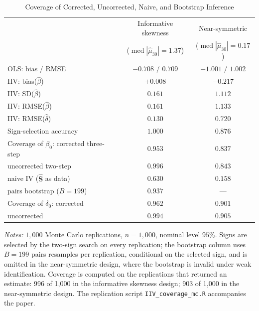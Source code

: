 \begin{table}[!h]
\centering
\caption{Coverage of Corrected, Uncorrected, Naive, and Bootstrap Inference}
\label{tab:coverage}
\begin{threeparttable}
\begin{tabular}{lcc}
\toprule
& Informative skewness & Near-symmetric \\
& (\(\operatorname{med}|\widehat\mu_{30}|=1.37\)) & (\(\operatorname{med}|\widehat\mu_{30}|=0.17\)) \\
\midrule
OLS: bias / RMSE                       & \(-0.708\) / \(0.709\) & \(-1.001\) / \(1.002\) \\
IIV: bias(\(\widehat\beta\))           & \(+0.008\) & \(-0.217\) \\
IIV: SD(\(\widehat\beta\))             & \(0.161\) & \(1.112\) \\
IIV: RMSE(\(\widehat\beta\))           & \(0.161\) & \(1.133\) \\
IIV: RMSE(\(\widehat\delta\))          & \(0.130\) & \(0.720\) \\
Sign-selection accuracy                & \(1.000\) & \(0.876\) \\
\midrule
Coverage of \(\beta_0\): corrected three-step & \(0.953\) & \(0.837\) \\
\quad uncorrected two-step             & \(0.996\) & \(0.843\) \\
\quad naive IV (\(\widehat{\mathbf S}\) as data) & \(0.630\) & \(0.158\) \\
\quad pairs bootstrap (\(B=199\))      & \(0.937\) & --- \\
\midrule
Coverage of \(\delta_0\): corrected    & \(0.962\) & \(0.901\) \\
\quad uncorrected                      & \(0.994\) & \(0.905\) \\
\bottomrule
\end{tabular}
\begin{tablenotes}
\small
\item \textit{Notes:} \(1{,}000\) Monte Carlo replications, \(n=1{,}000\),
nominal level \(95\%\). Signs are selected by the two-sign search on every
replication; the bootstrap column uses \(B=199\) pairs resamples per
replication, conditional on the selected sign, and is omitted in the
near-symmetric design, where the bootstrap is invalid under weak
identification. Coverage is computed on the replications that returned an
estimate: 996 of 1{,}000 in the informative skewness design; 903 of 1{,}000 in the near-symmetric design. The replication script
\texttt{IIV\_coverage\_mc.R} accompanies the paper.
\end{tablenotes}
\end{threeparttable}
\end{table}
